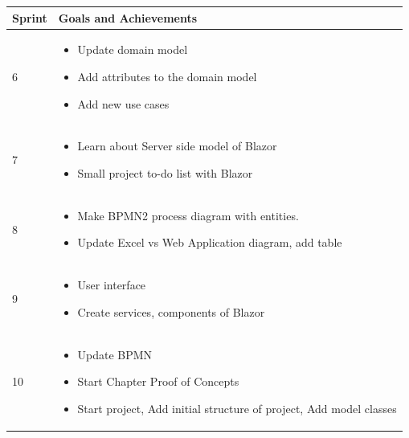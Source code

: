 \documentclass{scrartcl}
\begin{document}
\pagebreak

\begin{table}[H]
\begin{center}
\begin{tabular}{| p{2.5cm}| p{12cm} |}
\hline
\rowcolor{LightCyan}
\textbf{Sprint} & \textbf{Goals and Achievements} \\
\hline

6                &             
\begin{itemize}
 \item Update domain model
 \item Add attributes to the domain model
 \item Add new use cases


 \end{itemize}\\ \hline
 
  7                 &             
\begin{itemize}
 \item  Learn about Server side model of Blazor
 \item Small  project to-do list with Blazor
 \end{itemize}\\ \hline
 
  8                 &             
\begin{itemize}
 \item Make BPMN2 process diagram with entities.
 \item Update Excel vs Web Application diagram, add table
 \end{itemize}\\ \hline
 
  9                 &             
\begin{itemize}
 \item User interface
 \item  Create services, components of Blazor
 
\end{itemize}\\ \hline
 
  10                &             
\begin{itemize}
 \item Update BPMN
 \item Start Chapter Proof of Concepts
 
 \item Start project, Add initial structure of project, Add model classes


 \end{itemize}\\ \hline
 

\end{tabular}
\end{center}
\end{table}
\end{document}

